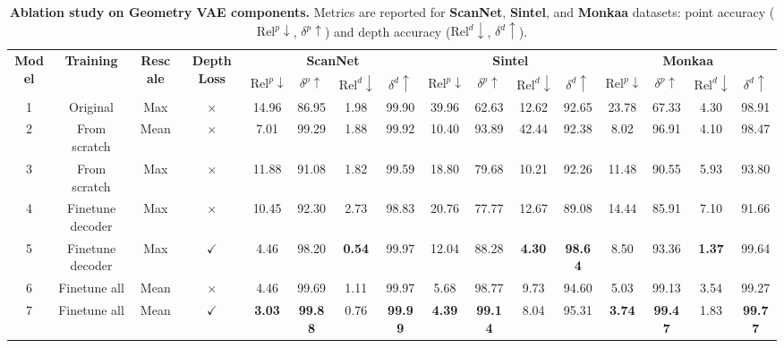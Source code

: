 
\begin{table}[t]
\centering
\caption{
\textbf{Ablation study on Geometry VAE components.}
Metrics are reported for \textbf{ScanNet}, \textbf{Sintel}, and \textbf{Monkaa} datasets:
point accuracy ($\text{Rel}^{p}\!\downarrow$, $\delta^{p}\!\uparrow$) and depth accuracy ($\text{Rel}^{d}\!\downarrow$, $\delta^{d}\!\uparrow$).
}
\label{tab:more_ablation_vae}
\begin{adjustbox}{width=\textwidth}
\begin{tabular}{cccc|cccc|cccc|cccc}
\toprule
\multirow{2}{*}{\textbf{Model}} & 
\multirow{2}{*}{\textbf{Training}} & 
\multirow{2}{*}{\textbf{Rescale}} & 
\multirow{2}{*}{\textbf{Depth Loss}} &
\multicolumn{4}{c|}{\textbf{ScanNet}} &
\multicolumn{4}{c|}{\textbf{Sintel}} &
\multicolumn{4}{c}{\textbf{Monkaa}} \\
& & & &
$\text{Rel}^{p}\!\downarrow$ & $\delta^{p}\!\uparrow$ &
$\text{Rel}^{d}\!\downarrow$ & $\delta^{d}\!\uparrow$ &
$\text{Rel}^{p}\!\downarrow$ & $\delta^{p}\!\uparrow$ &
$\text{Rel}^{d}\!\downarrow$ & $\delta^{d}\!\uparrow$ &
$\text{Rel}^{p}\!\downarrow$ & $\delta^{p}\!\uparrow$ &
$\text{Rel}^{d}\!\downarrow$ & $\delta^{d}\!\uparrow$ \\
\midrule
1 & Original  & Max & $\times$ &
14.96 & 86.95 & 1.98 & 99.90 &
39.96 & 62.63 & 12.62 & 92.65 &
23.78 & 67.33 & 4.30 & 98.91 \\

2 & From scratch & Mean & $\times$ &
7.01 & 99.29 & 1.88 & 99.92 &
10.40 & 93.89 & 42.44 & 92.38 &
8.02 & 96.91 & 4.10 & 98.47 \\

3 & From scratch & Max & $\times$ &
11.88 & 91.08 & 1.82 & 99.59 &
18.80 & 79.68 & 10.21 & 92.26 &
11.48 & 90.55 & 5.93 & 93.80 \\

4 & Finetune decoder & Max & $\times$ &
10.45 & 92.30 & 2.73 & 98.83 &
20.76 & 77.77 & 12.67 & 89.08 &
14.44 & 85.91 & 7.10 & 91.66 \\

5 & Finetune decoder & Max & $\checkmark$ &
4.46 & 98.20 & \textbf{0.54} & 99.97 &
12.04 & 88.28 & \textbf{4.30} & \textbf{98.64} &
8.50 & 93.36 & \textbf{1.37} & 99.64 \\

6 & Finetune all & Mean & $\times$ &
4.46 & 99.69 & 1.11 & 99.97 &
5.68 & 98.77 & 9.73 & 94.60 &
5.03 & 99.13 & 3.54 & 99.27 \\

7 & Finetune all & Mean & $\checkmark$ &
\textbf{3.03} & \textbf{99.88} & 0.76 & \textbf{99.99} &
\textbf{4.39} & \textbf{99.14} & 8.04 & 95.31 &
\textbf{3.74} & \textbf{99.47} & 1.83 & \textbf{99.77} \\
\bottomrule
\end{tabular}
\end{adjustbox}
\end{table}

